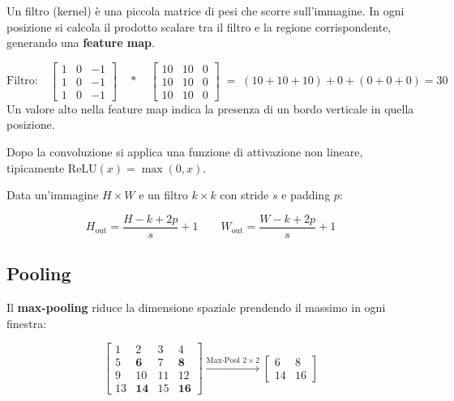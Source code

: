 \documentclass[
  11pt,
]{article}
\begin{document}
Un filtro (kernel) è una piccola matrice di pesi che scorre sull'immagine. In ogni posizione si calcola il prodotto scalare tra il filtro e la regione corrispondente, generando una \textbf{feature map}.

\begin{formulabox}[title={\textbf{Esempio: filtro per bordi verticali}}]
\[
\text{Filtro:}\quad
\begin{bmatrix}
1 & 0 & -1 \\
1 & 0 & -1 \\
1 & 0 & -1
\end{bmatrix}
\quad \ast \quad
\begin{bmatrix}
10 & 10 & 0 \\
10 & 10 & 0 \\
10 & 10 & 0
\end{bmatrix}
\;=\; (10 + 10 + 10) + 0 + (0 + 0 + 0) = 30
\]
Un valore alto nella feature map indica la presenza di un bordo verticale in quella posizione.
\end{formulabox}

Dopo la convoluzione si applica una funzione di attivazione non lineare, tipicamente $\text{ReLU}(x) = \max(0, x)$.

\begin{formulabox}[title={\textbf{Dimensione dell'output di una convoluzione}}]
Data un'immagine $H \times W$ e un filtro $k \times k$ con stride $s$ e padding $p$:

\[
H_{\text{out}} = \frac{H - k + 2p}{s} + 1 \qquad W_{\text{out}} = \frac{W - k + 2p}{s} + 1
\]
\end{formulabox}

\subsection{Pooling}

Il \textbf{max-pooling} riduce la dimensione spaziale prendendo il massimo in ogni finestra:

\[
\begin{bmatrix}
1 & 2 & 3 & 4 \\
5 & \mathbf{6} & 7 & \mathbf{8} \\
9 & 10 & 11 & 12 \\
13 & \mathbf{14} & 15 & \mathbf{16}
\end{bmatrix}
\xrightarrow{\text{Max-Pool } 2\!\times\!2}
\begin{bmatrix}
6 & 8 \\
14 & 16
\end{bmatrix}
\]
\end{document}
